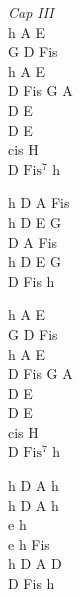 \begin{chord}
    \textit{Cap III}\\
    h A E\\
    G D Fis\\
    h A E\\
    D Fis G A\\
    D E\\
    D E\\
    cis H\\
    D $\mathrm{Fis^7}$ h

    h D A Fis\\
    h D E G\\
    D A Fis\\
    h D E G\\
    D Fis h

    h A E\\
    G D Fis\\
    h A E\\
    D Fis G A\\
    D E\\
    D E\\
    cis H\\
    D $\mathrm{Fis^7}$ h

    h D A h\\
    h D A h\\
    e h\\
    e h Fis\\
    h D A D\\
    D Fis h
\end{chord}
